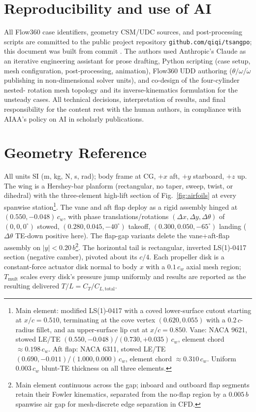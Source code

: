 \documentclass[conf]{new-aiaa}
\begin{document}
\section*{Reproducibility and use of AI}

All Flow360 case identifiers, geometry CSM/UDC sources, and
post-processing scripts are committed to the public project
repository \texttt{github.com/qiqi/tsangpo}; this document was
built from commit \texttt{\repocommit}.  The authors used Anthropic's
Claude as an iterative engineering assistant for prose
drafting, Python scripting (case setup, mesh configuration,
post-processing, animation), Flow360 UDD authoring
($\theta/\omega/\dot\omega$ publishing in non-dimensional
solver units), and co-design of the four-cylinder nested-
rotation mesh topology and its inverse-kinematics formulation
for the unsteady cases.  All technical decisions,
interpretation of results, and final responsibility for the
content rest with the human authors, in compliance with AIAA's
policy on AI in scholarly publications.



\appendix
\section{Geometry Reference}

All units SI (m, kg, N, s, rad); body frame at CG, $+x$ aft,
$+y$ starboard, $+z$ up.  The wing is a Hershey-bar planform
(rectangular, no taper, sweep, twist, or dihedral) with the
three-element high-lift section of Fig.~\ref{fig:airfoils} at
every spanwise station\footnote{Main element: modified
LS(1)-0417 with a coved lower-surface cutout starting at
$x/c=0.510$, terminating at the cove vertex $(0.620, 0.055)$
with a $0.2\,c$-radius fillet, and an upper-surface lip cut at
$x/c=0.850$.  Vane: NACA 9621, stowed LE/TE
$(0.550,-0.048)/(0.730,+0.035)\,c_w$, element chord
$\approx 0.198\,c_w$.  Aft flap: NACA 6311, stowed LE/TE
$(0.690,-0.011)/(1.000, 0.000)\,c_w$, element chord
$\approx 0.310\,c_w$.  Uniform $0.003\,c_w$ blunt-TE thickness
on all three elements.}.  The vane and aft flap deploy as a
rigid assembly hinged at $(0.550,-0.048)\,c_w$, with phase
translations/rotations $(\Delta x, \Delta y, \Delta\theta)$ of
$(0,0,0^\circ)$ stowed, $(0.280, 0.045, -40^\circ)$ takeoff,
$(0.300, 0.050, -65^\circ)$ landing ($\Delta\theta$ TE-down
positive here).  The flap-gap variants delete the
vane+aft-flap assembly on $|y|<0.20\,b$\footnote{Main element
continuous across the gap; inboard and outboard flap segments
retain their Fowler kinematics, separated from the no-flap
region by a $0.005\,b$ spanwise air gap for mesh-discrete edge
separation in CFD.}.  The horizontal tail is rectangular,
inverted LS(1)-0417 section (negative camber), pivoted about
its $c/4$.  Each propeller disk is a constant-force actuator
disk normal to body $x$ with a $0.1\,c_w$ axial mesh region;
$T_{\mathrm{mult}}$ scales every disk's pressure jump uniformly
and results are reported as the resulting delivered
$T/L = C_T/C_{L,\mathrm{total}}$.
\end{document}
